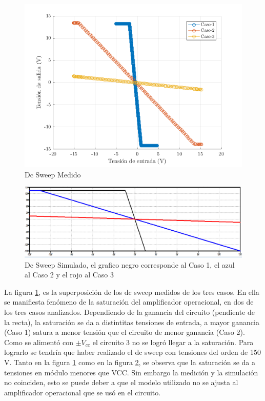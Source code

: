 \documentclass[../../main.tex]{subfiles}
\begin{document}
\begin{figure}[H]
\centering
\includegraphics[width=1\textwidth]{dc_sweep_inv}
\caption{Dc Sweep Medido} \label{fig=dcInv}
\end{figure}

\begin{figure}[H]
\centering
\includegraphics[width=1.1\textwidth]{dc_sweep_inv_sim}
\caption{Dc Sweep Simulado, el grafico negro corresponde al Caso 1, el azul al Caso 2 y el rojo al Caso 3} \label{fig=dcInvSim}
\end{figure}

La figura \ref{fig=dcInv}, es la superposición de los dc sweep medidos de los tres casos. En ella se manifiesta fenómeno de la saturación del amplificador operacional, en dos de los tres casos analizados. Dependiendo de la ganancia del circuito (pendiente de la recta), la saturación se da a distintitas tensiones de entrada, a mayor ganancia (Caso 1) satura a menor tensión que el circuito de menor ganancia (Caso 2). Como se alimentó con $\pm V_{cc}$ el circuito 3 no se logró llegar a la saturación. Para lograrlo se tendría que haber realizado el dc sweep con tensiones del orden de 150 V.
Tanto en la figura \ref{fig=dcInv} como en la figura \ref{fig=dcInvSim},  se observa que la saturación se da a tensiones en módulo menores que VCC. Sin embargo la medición y la simulación no coinciden, esto se puede deber a que el modelo utilizado no se ajusta al amplificador operacional que se usó en el circuito.
\end{document}
